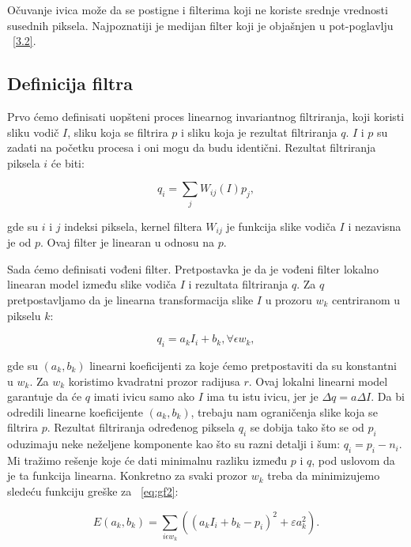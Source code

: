 \documentclass[a4paper,12pt,titlepage]{article}
\begin{document}
Očuvanje ivica može da se postigne i filterima koji ne koriste srednje vrednosti susednih piksela. Najpoznatiji je medijan filter koji je objašnjen u pot-poglavlju ~\ref{3.2}.

\subsection{Definicija filtra}\label{4.3}%

Prvo ćemo definisati uopšteni proces linearnog invariantnog filtriranja, koji koristi sliku vodič $I$, sliku koja se filtrira $p$ i sliku koja je rezultat filtriranja $q$. $I$ i $p$ su zadati na početku procesa i oni mogu da budu identični. Rezultat filtriranja piksela $i$ će biti: 

\begin{equation}\label{eq:gf1}
q_i = \sum_{j} W_{ij}(I)p_j,
\end{equation}

gde su $i$ i $j$ indeksi piksela, kernel filtera $W_{ij}$ je funkcija slike vodiča $I$ i nezavisna je od $p$. Ovaj filter je linearan u odnosu na $p$. 

Sada ćemo definisati vođeni filter. Pretpostavka je da je vođeni filter lokalno linearan model između slike vodiča $I$ i rezultata filtriranja $q$. Za $q$ pretpostavljamo da je linearna transformacija slike $I$ u prozoru $w_k$ centriranom u pikselu $k$:

\begin{equation}\label{eq:gf2}
q_i = a_kI_i + b_k, \forall \epsilon w_k,
\end{equation}

gde su $(a_k, b_k)$ linearni koeficijenti za koje ćemo pretpostaviti da su konstantni u $w_k$. Za $w_k$ koristimo kvadratni prozor radijusa $r$. Ovaj lokalni linearni model garantuje da će $q$ imati ivicu samo ako $I$ ima tu istu ivicu, jer je $\Delta q = a\Delta I$. Da bi odredili linearne koeficijente $(a_k, b_k)$, trebaju nam ograničenja slike koja se filtrira $p$. Rezultat filtriranja određenog piksela $q_i$ se dobija tako što se od $p_i$ oduzimaju neke neželjene komponente kao što su razni detalji i šum: $q_i = p_i - n_i$. Mi tražimo rešenje koje će dati minimalnu razliku između $p$ i $q$, pod uslovom da je ta funkcija linearna. Konkretno za svaki prozor $w_k$ treba da minimizujemo sledeću funkciju greške za ~\ref{eq:gf2}:

\begin{equation}\label{eq:gf3}
E(a_k, b_k) = \sum_{i \epsilon w_k} ((a_kI_i + b_k - p_i)^2 + \varepsilon a_k^2).
\end{equation}
\end{document}
